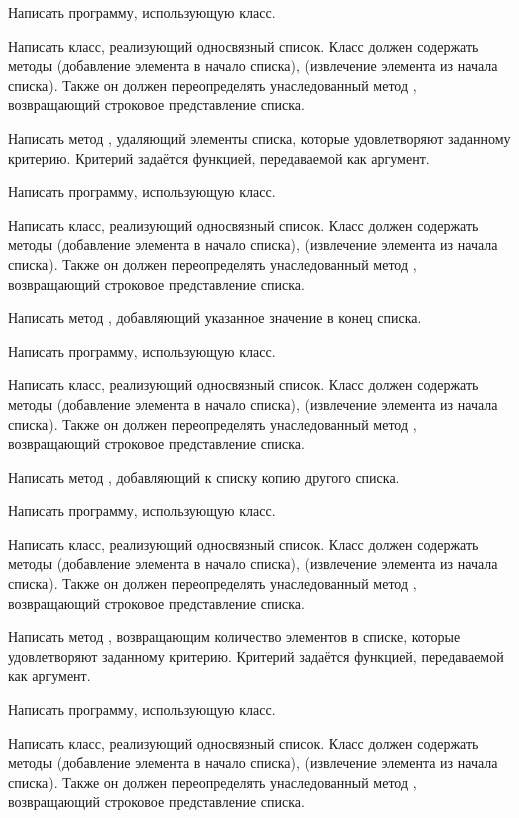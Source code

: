 Написать программу, использующую класс.

\task Написать класс, реализующий односвязный список. Класс должен
содержать методы  (добавление элемента в начало списка),
 (извлечение элемента из начала списка). Также он должен
переопределять унаследованный метод , возвращающий
строковое представление списка.

Написать метод , удаляющий элементы списка, которые
удовлетворяют заданному критерию. Критерий задаётся функцией,
передаваемой как аргумент. 

Написать программу, использующую класс.

\task Написать класс, реализующий односвязный список. Класс должен
содержать методы  (добавление элемента в начало списка),
 (извлечение элемента из начала списка). Также он должен
переопределять унаследованный метод , возвращающий
строковое представление списка.

Написать метод , добавляющий указанное значение в конец
списка.

Написать программу, использующую класс.

\task Написать класс, реализующий односвязный список. Класс должен
содержать методы  (добавление элемента в начало списка),
 (извлечение элемента из начала списка). Также он должен
переопределять унаследованный метод , возвращающий
строковое представление списка.

Написать метод , добавляющий к списку копию другого
списка.

Написать программу, использующую класс.

\task Написать класс, реализующий односвязный список. Класс должен
содержать методы  (добавление элемента в начало списка),
 (извлечение элемента из начала списка). Также он должен
переопределять унаследованный метод , возвращающий
строковое представление списка.

Написать метод , возвращающим количество элементов в
списке, которые удовлетворяют заданному критерию. Критерий задаётся
функцией, передаваемой как аргумент.

Написать программу, использующую класс.

\task Написать класс, реализующий односвязный список. Класс должен
содержать методы  (добавление элемента в начало списка),
 (извлечение элемента из начала списка). Также он должен
переопределять унаследованный метод , возвращающий
строковое представление списка.

